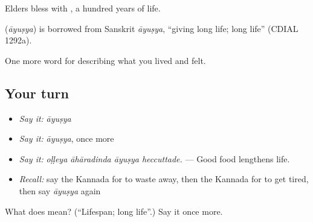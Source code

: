Elders bless with   , a hundred years of life.

\begin{cousinweb}
\textbf{} (\emph{āyuṣya}) is borrowed from Sanskrit \emph{āyuṣya}, \textquotedblleft{}giving long life; long life\textquotedblright{} (CDIAL 1292a).
\end{cousinweb}

\begin{grammarlens}[title={What you've built}]
One more word for describing what you lived and felt.
\end{grammarlens}

\subsection*{Your turn}
\begin{itemize}
\raggedright
  \item \emph{Say it:} \emph{āyuṣya}
  \item \emph{Say it:} \emph{āyuṣya}, once more
  \item \emph{Say it:} \emph{oḷḷeya āhāradinda āyuṣya heccuttade.} — Good food lengthens life.
  \item \emph{Recall:} say the Kannada for to waste away, then the Kannada for to get tired, then say \emph{āyuṣya} again
\end{itemize}

\begin{tcolorbox}[breakable,colback=teal!4,colframe=teal!35!black,title={Before you move on}]
What does  mean? (\textquotedblleft{}Lifespan; long life\textquotedblright{}.) Say it once more.
\end{tcolorbox}
